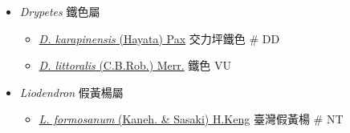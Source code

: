 
  \begin{itemize}
 \item[] \textit{Drypetes} 鐵色屬
                                
  \begin{itemize}
        \item[] \href{http://www.theplantlist.org/tpl1.1/search?q=Drypetes+karapinensis}{\textit{D. karapinensis} (Hayata) Pax}   交力坪鐵色  \# DD
        \item[] \href{http://www.theplantlist.org/tpl1.1/search?q=Drypetes+littoralis}{\textit{D. littoralis} (C.B.Rob.) Merr.}   鐵色   VU
  \end{itemize}
 \item[] \textit{Liodendron} 假黃楊屬
                                
  \begin{itemize}
        \item[] \href{http://www.theplantlist.org/tpl1.1/search?q=Liodendron+formosanum}{\textit{L. formosanum} (Kaneh. \& Sasaki) H.Keng}   臺灣假黃楊  \# NT
  \end{itemize}
  \end{itemize}
